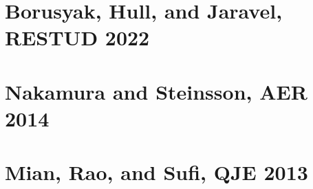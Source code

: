 \documentclass[english,xcolor=svgnames]{beamer}
\begin{document}
\section{Borusyak, Hull, and Jaravel, RESTUD 2022}

\section{Nakamura and Steinsson, AER 2014}

\section{Mian, Rao, and Sufi, QJE 2013}
\end{document}
